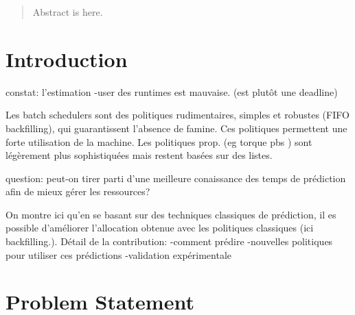 \documentclass{llncs}
\begin{document}
\mainmatter


\author{Ivar Ekeland \and Roger Temam
Jeffrey Dean \and David Grove \and Craig Chambers \and Kim~B.~Bruce \and
Elsa Bertino}


\maketitle              %

\begin{abstract}

Abstract is here.

\end{abstract}






\section{Introduction}
\label{sec:introduction}
constat: l'estimation -user des runtimes est mauvaise. (est plutôt une deadline)

Les batch schedulers sont des politiques rudimentaires, simples et robustes (FIFO backfilling), qui guarantissent l'absence de famine. Ces politiques permettent une forte utilisation de la machine.
Les politiques prop. (eg torque pbs ) sont légèrement plus sophistiquées mais restent basées sur des listes.\

question: peut-on tirer parti d'une meilleure conaissance des temps de prédiction afin de mieux gérer les ressources?

On montre ici qu'en se basant sur des techniques classiques de prédiction, il es possible d'améliorer  l'allocation obtenue avec les politiques classiques (ici backfilling.).
Détail de la contribution:
-comment prédire
-nouvelles politiques pour utiliser ces prédictions
-validation expérimentale

\section{Problem Statement}
\label{sec:problem_statement}
\end{document}
